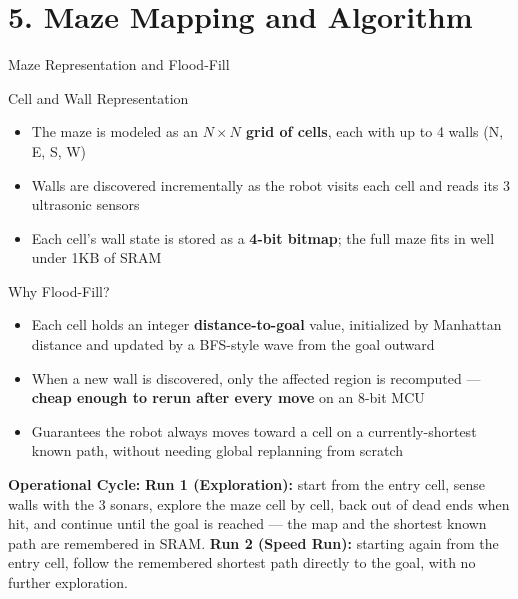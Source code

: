 \documentclass[aspectratio=169,11pt]{beamer}
\newcommand{\highlight}[1]{\textcolor{teal!80!black}{\textbf{#1}}}
\begin{document}
\section{5. Maze Mapping and Algorithm}
\begin{frame}{Maze Representation and Flood-Fill}
    \scriptsize
    \begin{block}{Cell and Wall Representation}
        \begin{itemize}\setlength{\itemsep}{0pt}\setlength{\parskip}{0pt}
            \item The maze is modeled as an \highlight{$N \times N$ grid of cells}, each with up to 4 walls (N, E, S, W)
            \item Walls are discovered incrementally as the robot visits each cell and reads its 3 ultrasonic sensors
            \item Each cell's wall state is stored as a \highlight{4-bit bitmap}; the full maze fits in well under 1KB of SRAM
        \end{itemize}
    \end{block}

    \vspace{0.15cm}
    \begin{block}{Why Flood-Fill?}
        \begin{itemize}\setlength{\itemsep}{0pt}\setlength{\parskip}{0pt}
            \item Each cell holds an integer \highlight{distance-to-goal} value, initialized by Manhattan distance and updated by a BFS-style wave from the goal outward
            \item When a new wall is discovered, only the affected region is recomputed --- \highlight{cheap enough to rerun after every move} on an 8-bit MCU
            \item Guarantees the robot always moves toward a cell on a currently-shortest known path, without needing global replanning from scratch
        \end{itemize}
    \end{block}

    \vspace{0.15cm}
    \textbf{Operational Cycle:} \highlight{Run 1 (Exploration):} start from the entry cell, sense walls with the 3 sonars, explore the maze cell by cell, back out of dead ends when hit, and continue until the goal is reached --- the map and the shortest known path are remembered in SRAM. \highlight{Run 2 (Speed Run):} starting again from the entry cell, follow the remembered shortest path directly to the goal, with no further exploration.
\end{frame}
\end{document}
